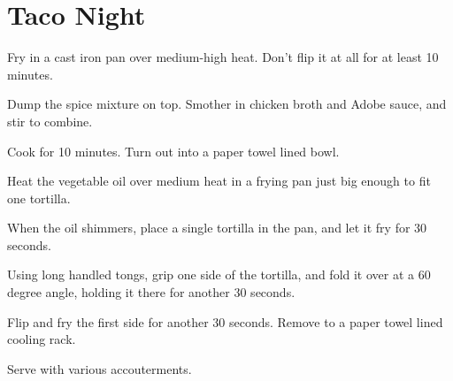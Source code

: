 
\section{Taco Night}
\begin{recipe}



Fry in a cast iron pan over medium-high heat. Don't flip it at all for at least 10 minutes.


Dump the spice mixture on top. Smother in chicken broth and Adobe sauce, and stir to combine.

Cook for 10 minutes. Turn out into a paper towel lined bowl.


Heat the vegetable oil over medium heat in a frying pan just big enough to fit one tortilla.

When the oil shimmers, place a single tortilla in the pan, and let it fry for 30 seconds.

Using long handled tongs, grip one side of the tortilla, and fold it over at a 60 degree angle, holding it there for another 30 seconds.

Flip and fry the first side for another 30 seconds. Remove to a paper towel lined cooling rack.


Serve with various accouterments.


\end{recipe}
